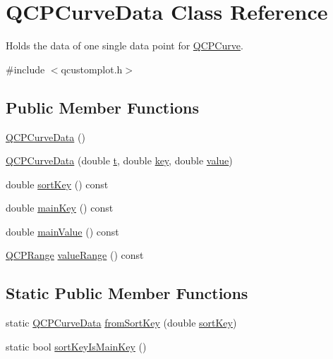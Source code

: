 \hypertarget{class_q_c_p_curve_data}{}\section{Q\+C\+P\+Curve\+Data Class Reference}
\label{class_q_c_p_curve_data}


Holds the data of one single data point for \hyperlink{class_q_c_p_curve}{Q\+C\+P\+Curve}.  




{\ttfamily \#include $<$qcustomplot.\+h$>$}

\subsection*{Public Member Functions}
\begin{DoxyCompactItemize}
\item 
\hyperlink{class_q_c_p_curve_data_a48252779b5198a509d99c69ae223fbf8}{Q\+C\+P\+Curve\+Data} ()
\item 
\hyperlink{class_q_c_p_curve_data_a3586be0cc6f8db15bcdd0c0d03b0c173}{Q\+C\+P\+Curve\+Data} (double \hyperlink{class_q_c_p_curve_data_aecc395525be28e9178a088793beb3ff3}{t}, double \hyperlink{class_q_c_p_curve_data_a8a4ec5f2b9a396149fd842e309701bd4}{key}, double \hyperlink{class_q_c_p_curve_data_a72b39b8e1dbf7b45382ebd48419b6828}{value})
\item 
double \hyperlink{class_q_c_p_curve_data_a583174f2b68e01b4d545f04571f58bd0}{sort\+Key} () const
\item 
double \hyperlink{class_q_c_p_curve_data_ac805ffc8b4207652efb9fcc6a2cdd3e8}{main\+Key} () const
\item 
double \hyperlink{class_q_c_p_curve_data_a39a94131e5f62f16b256bcf8c47a3205}{main\+Value} () const
\item 
\hyperlink{class_q_c_p_range}{Q\+C\+P\+Range} \hyperlink{class_q_c_p_curve_data_acf15deffd18d400651f8384a95dad9f8}{value\+Range} () const
\end{DoxyCompactItemize}
\subsection*{Static Public Member Functions}
\begin{DoxyCompactItemize}
\item 
static \hyperlink{class_q_c_p_curve_data}{Q\+C\+P\+Curve\+Data} \hyperlink{class_q_c_p_curve_data_a40adf1a6ba93051c415a65298b49aa6e}{from\+Sort\+Key} (double \hyperlink{class_q_c_p_curve_data_a583174f2b68e01b4d545f04571f58bd0}{sort\+Key})
\item 
static bool \hyperlink{class_q_c_p_curve_data_a1b78f228e31ca40a1e69add44537918c}{sort\+Key\+Is\+Main\+Key} ()
\end{DoxyCompactItemize}
